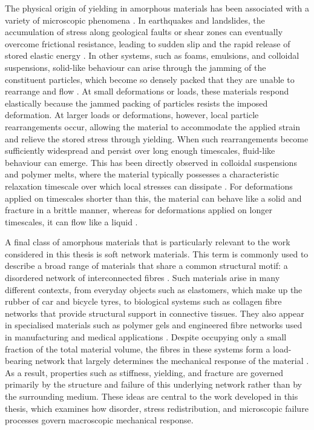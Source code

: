 \documentclass[asymmetricmargins]{library/duthesis}%
\begin{document}
The physical origin of yielding in amorphous materials has been associated with a variety of microscopic phenomena \cite{bonn_yield_2017}. In earthquakes and landslides, the accumulation of stress along geological faults or shear zones can eventually overcome frictional resistance, leading to sudden slip and the rapid release of stored elastic energy \cite{Cocco2023}. In other systems, such as foams, emulsions, and colloidal suspensions, solid-like behaviour can arise through the jamming of the constituent particles, which become so densely packed that they are unable to rearrange and flow \cite{Mason1996,Datta2011,Derkach2009,AbuJdayil2003,Mewis2011,Koumakis2011,Petekidis2004,Cloitre2003,Torquato2010,Paredes2013,durian_foam_1995,WEAIRE2008}. At small deformations or loads, these materials respond elastically because the jammed packing of particles resists the imposed deformation. At larger loads or deformations, however, local particle rearrangements occur, allowing the material to accommodate the applied strain and relieve the stored stress through yielding. When such rearrangements become sufficiently widespread and persist over long enough timescales, fluid-like behaviour can emerge. This has been directly observed in colloidal suspensions and polymer melts, where the material typically possesses a characteristic relaxation timescale over which local stresses can dissipate \cite{Koumakis2011,Petekidis2004,Nordstrom2010}. For deformations applied on timescales shorter than this, the material can behave like a solid and fracture in a brittle manner, whereas for deformations applied on longer timescales, it can flow like a liquid \cite{nicolas_deformation_2018,bonn_yield_2017}.

A final class of amorphous materials that is particularly relevant to the work considered in this thesis is soft network materials. This term is commonly used to describe a broad range of materials that share a common structural motif: a disordered network of interconnected fibres \cite{tauber_microscopic_2020,gong_why_2010,tanaka_determination_2005,biotTheoryFiniteDeformations1972,mackintosh_elasticity_1995,Arevalo_Stress_Heterogeneities_2015}. Such materials arise in many different contexts, from everyday objects such as elastomers, which make up the rubber of car and bicycle tyres, to biological systems such as collagen fibre networks that provide structural support in connective tissues. They also appear in specialised materials such as polymer gels and engineered fibre networks used in manufacturing and medical applications \cite{yasudaNovelDoubleNetworkHydrogel2009,yinSelfHealingHydrogelsSynthesis2023,hoHydrogelsPropertiesApplications2022}. Despite occupying only a small fraction of the total material volume, the fibres in these systems form a load-bearing network that largely determines the mechanical response of the material \cite{Bonamy2011,sharma_strain-controlled_2016,Arevalo2015}. As a result, properties such as stiffness, yielding, and fracture are governed primarily by the structure and failure of this underlying network rather than by the surrounding medium. These ideas are central to the work developed in this thesis, which examines how disorder, stress redistribution, and microscopic failure processes govern macroscopic mechanical response.
\end{document}
